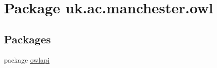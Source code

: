 \hypertarget{namespaceuk_1_1ac_1_1manchester_1_1owl}{\section{Package uk.\-ac.\-manchester.\-owl}
\label{namespaceuk_1_1ac_1_1manchester_1_1owl}
}
\subsection*{Packages}
\begin{DoxyCompactItemize}
\item 
package \hyperlink{namespaceuk_1_1ac_1_1manchester_1_1owl_1_1owlapi}{owlapi}
\end{DoxyCompactItemize}
